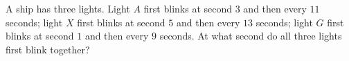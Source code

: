 A ship has three lights. Light $A$ first blinks at second $3$ and then every $11$ seconds; light $X$ first blinks at second $5$ and then every $13$ seconds; light $G$ first blinks at second $1$ and then every $9$ seconds. At what second do all three lights first blink together?
